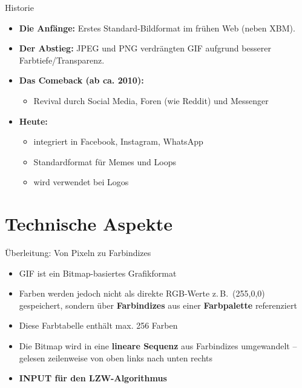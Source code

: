 \documentclass[aspectratio=169]{beamer}
\begin{document}
\begin{frame}{Historie}
    \begin{itemize}
        \item \textbf{Die Anfänge:} Erstes Standard-Bildformat im frühen Web (neben XBM).
        \item \textbf{Der Abstieg:} JPEG und PNG verdrängten GIF aufgrund besserer Farbtiefe/Transparenz.
        \item \textbf{Das Comeback (ab ca. 2010):}
        \begin{itemize}
            \item Revival durch Social Media, Foren (wie Reddit) und Messenger
        \end{itemize}
        \item \textbf{Heute:}
        \begin{itemize}
            \item integriert in Facebook, Instagram, WhatsApp
            \item Standardformat für Memes und Loops
            \item wird verwendet bei Logos
        \end{itemize}
    \end{itemize}
\end{frame}

\section{Technische Aspekte}

\begin{frame}{Überleitung: Von Pixeln zu Farbindizes}
    \begin{itemize}
        \item GIF ist ein Bitmap-basiertes Grafikformat
        \item Farben werden jedoch nicht als direkte RGB-Werte z.\,B.\ (255,0,0) gespeichert, sondern über \textbf{Farbindizes} aus einer \textbf{Farbpalette} referenziert
        \item Diese Farbtabelle enthält max. 256 Farben
        \item Die Bitmap wird in eine \textbf{lineare Sequenz} aus Farbindizes umgewandelt – gelesen zeilenweise von oben links nach unten rechts
        \item[$\Rightarrow$] \textbf{INPUT für den LZW-Algorithmus}
    \end{itemize}
\end{frame}
\end{document}
